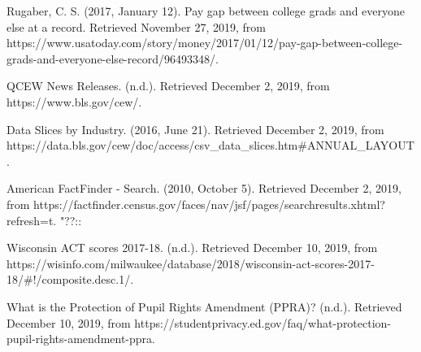 \documentclass[letterpaper, 10 pt, conference]{ieeeconf}  %
\begin{document}



\begin{thebibliography}{99}

 Rugaber, C. S. (2017, January 12). Pay gap between college grads and everyone else at a record. Retrieved November 27, 2019, from https://www.usatoday.com/story/money/2017/01/12/pay-gap-between-college-grads-and-everyone-else-record/96493348/.

 QCEW News Releases. (n.d.). Retrieved December 2, 2019, from https://www.bls.gov/cew/.

 Data Slices by Industry. (2016, June 21). Retrieved December 2, 2019, from \newline
https://data.bls.gov/cew/doc/access/csv\_data\_slices.htm\#ANNUAL\_LAYOUT.

 American FactFinder - Search. (2010, October 5). Retrieved December 2, 2019, from \newline https://factfinder.census.gov/faces/nav/jsf/pages/searchresults.xhtml?refresh=t.
"??::

 Wisconsin ACT scores 2017-18. (n.d.). Retrieved December 10, 2019, from https://wisinfo.com/milwaukee/database/2018/wisconsin-act-scores-2017-18/\#!/composite.desc.1/.

 What is the Protection of Pupil Rights Amendment (PPRA)? (n.d.). Retrieved December 10, 2019, from \newline https://studentprivacy.ed.gov/faq/what-protection-pupil-rights-amendment-ppra.

\end{thebibliography}


\onecolumn
\end{document}

